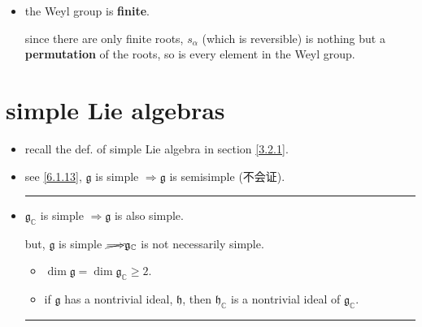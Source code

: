 \begin{itemize}
	\item the Weyl group is \textbf{finite}.
	
	\begin{tcolorbox}[title=proof:]
		since there are only finite roots, $s_\alpha$ (which is reversible) is nothing but a \textbf{permutation} of the roots, so is every element in the Weyl group.
	\end{tcolorbox}
\end{itemize}

\section{simple Lie algebras} \label{6.6}
\begin{itemize}
	\item recall the def. of simple Lie algebra in section \ref{3.2.1}.
	
	\item see \eqref{6.1.13}, $\mathfrak{g}$ is simple $\Longrightarrow \mathfrak{g}$ is semisimple (不会证).
	
	\noindent\rule[0.5ex]{\linewidth}{0.5pt} %
	
	\item $\mathfrak{g}_\mathbb{C}$ is simple $\Longrightarrow \mathfrak{g}$ is also simple.
	
	but, $\mathfrak{g}$ is simple $\cancel{\Longrightarrow} \mathfrak{g}_\mathbb{C}$ is not necessarily simple.
	
	\begin{tcolorbox}[title=proof:]
		\begin{itemize}
			\item $\dim \mathfrak{g} = \dim \mathfrak{g}_\mathbb{C} \geq 2$.
			
			\item if $\mathfrak{g}$ has a nontrivial ideal, $\mathfrak{h}$, then $\mathfrak{h}_\mathbb{C}$ is a nontrivial ideal of $\mathfrak{g}_\mathbb{C}$.
		\end{itemize}
	\end{tcolorbox}
	
	\noindent\rule[0.5ex]{\linewidth}{0.5pt} %
	

\end{itemize}
